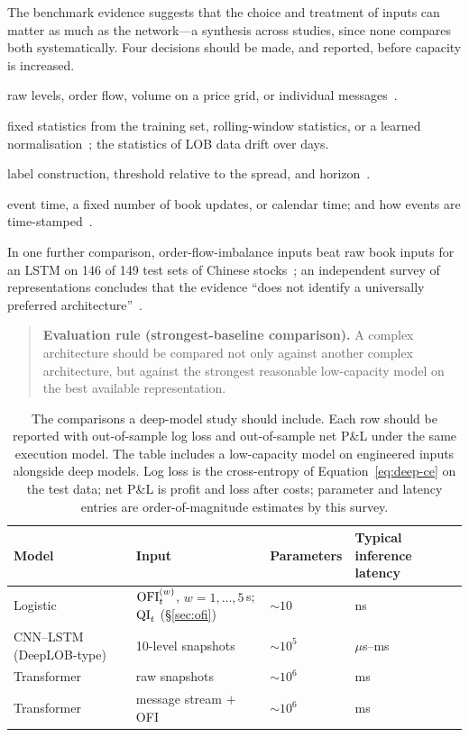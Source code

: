 The benchmark evidence suggests that the choice and treatment of inputs can matter as much as the
network---a synthesis across studies, since none compares both systematically. Four decisions should be made, and reported, before capacity is increased.
\begin{description}[leftmargin=1.5em,style=nextline,itemsep=2pt]
\item[Representation] raw levels, order flow, volume on a price grid, or individual
  messages~\citep{lucchese2024,kolm2023,wu2021robust,linna2025lobert}.
\item[Normalisation] fixed statistics from the training set, rolling-window statistics, or a learned
  normalisation~\citep{passalis2020dain}; the statistics of LOB data drift over days.
\item[Target] label construction, threshold relative to the spread, and horizon~\citep{berti2025tlob}.
\item[Clock] event time, a fixed number of book updates, or calendar time; and how events are
  time-stamped~\citep{kolm_westray}.
\end{description}

In one further comparison, order-flow-imbalance inputs beat raw book inputs for an LSTM on 146 of 149
test sets of Chinese stocks~\citep{yang2025siamese}; an independent survey of representations concludes that
the evidence ``does not identify a universally preferred architecture''~\citep{barbosa2026lobrep}.

\begin{quote}
\textbf{Evaluation rule (strongest-baseline comparison).} A complex architecture should be compared
not only against another complex architecture, but against the strongest reasonable low-capacity model
on the best available representation.
\end{quote}

\begin{table}[!htbp]
\centering\small
\caption{The comparisons a deep-model study should include. Each row should be reported with
out-of-sample log loss and out-of-sample net P\&L under the same execution model. The table includes a
low-capacity model on engineered inputs alongside deep models. Log loss is the cross-entropy of
Equation~\eqref{eq:deep-ce} on the test data; net P\&L is profit and loss after costs; parameter and latency
entries are order-of-magnitude estimates by this survey.}
\label{tab:baseline-template}
\setlength{\tabcolsep}{4pt}\footnotesize
\begin{tabular}{llll}
\toprule
Model & Input & Parameters & Typical inference latency \\
\midrule
Logistic & $\mathrm{OFI}^{(w)}_t$, $w = 1,\dots,5$\,s; $\mathrm{QI}_t$ (\S\ref{sec:ofi}) & $\sim 10$ & ns \\
CNN--LSTM (DeepLOB-type) & 10-level snapshots & $\sim 10^5$ & $\mu$s--ms \\
Transformer & raw snapshots & $\sim 10^6$ & ms \\
Transformer & message stream $+$ OFI & $\sim 10^6$ & ms \\
\bottomrule
\end{tabular}
\end{table}

